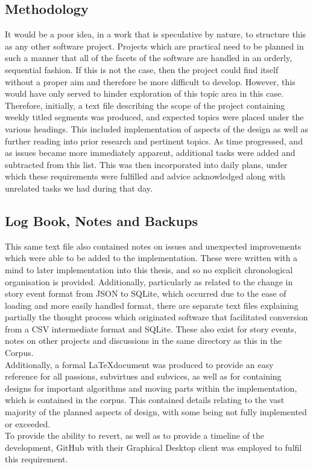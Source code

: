 \documentclass[11pt]{article}
\begin{document}
\subsection{Methodology}
It would be a poor idea, in a work that is speculative by nature, to structure this as any other software project. Projects which are practical need to be planned in such a manner that all of the facets of the software are handled in an orderly, sequential fashion. If this is not the case, then the project could find itself without a proper aim and therefore be more difficult to develop. However, this would have only served to hinder exploration of this topic area in this case. Therefore, initially, a text file describing the scope of the project containing weekly titled segments was produced, and expected topics were placed under the various headings. This included implementation of aspects of the design as well as further reading into prior research and pertinent topics. As time progressed, and as issues became more immediately apparent, additional tasks were added and subtracted from this list. This was then incorporated into daily plans, under which these requirements were fulfilled and advice acknowledged along with unrelated tasks we had during that day.\\ 
\subsection{Log Book, Notes and Backups} 
This same text file also contained notes on issues and unexpected improvements which were able to be added to the implementation. These were written with a mind to later implementation into this thesis, and so no explicit chronological organisation is provided. Additionally, particularly as related to the change in story event format from JSON to SQLite, which occurred due to the ease of loading and more easily handled format, there are separate text files explaining partially the thought process which originated software that facilitated conversion from a CSV intermediate format and SQLite. These also exist for story events, notes on other projects and discussions in the same directory as this in the Corpus.\\
Additionally, a formal \LaTeX document was produced to provide an easy reference for all passions, subvirtues and subvices, as well as for containing designs for important algorithms and moving parts within the implementation, which is contained in the corpus. This contained details relating to the vast majority of the planned aspects of design, with some being not fully implemented or exceeded.\\
To provide the ability to revert, as well as to provide a timeline of the development, GitHub with their Graphical Desktop client was employed to fulfil this requirement.\\
\end{document}
